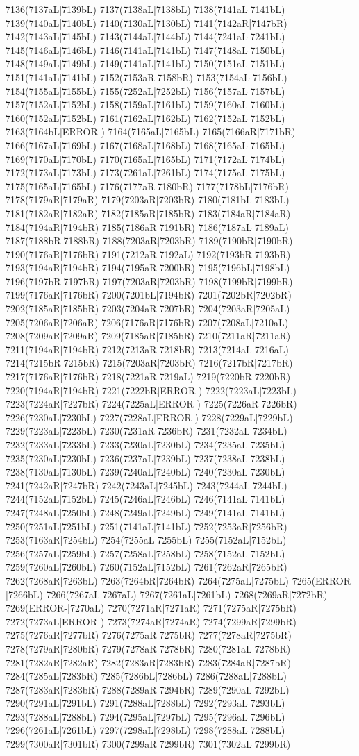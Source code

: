 7136(7137aL|7139bL) 7137(7138aL|7138bL) 7138(7141aL|7141bL) 7139(7140aL|7140bL) 7140(7130aL|7130bL) 7141(7142aR|7147bR) 7142(7143aL|7145bL) 7143(7144aL|7144bL) 7144(7241aL|7241bL) 7145(7146aL|7146bL) 7146(7141aL|7141bL) 7147(7148aL|7150bL) 7148(7149aL|7149bL) 7149(7141aL|7141bL) 7150(7151aL|7151bL) 7151(7141aL|7141bL) 7152(7153aR|7158bR) 7153(7154aL|7156bL) 7154(7155aL|7155bL) 7155(7252aL|7252bL) 7156(7157aL|7157bL) 7157(7152aL|7152bL) 7158(7159aL|7161bL) 7159(7160aL|7160bL) 7160(7152aL|7152bL) 7161(7162aL|7162bL) 7162(7152aL|7152bL) 7163(7164bL|ERROR-) 7164(7165aL|7165bL) 7165(7166aR|7171bR) 7166(7167aL|7169bL) 7167(7168aL|7168bL) 7168(7165aL|7165bL) 7169(7170aL|7170bL) 7170(7165aL|7165bL) 7171(7172aL|7174bL) 7172(7173aL|7173bL) 7173(7261aL|7261bL) 7174(7175aL|7175bL) 7175(7165aL|7165bL) 7176(7177aR|7180bR) 7177(7178bL|7176bR) 7178(7179aR|7179aR) 7179(7203aR|7203bR) 7180(7181bL|7183bL) 7181(7182aR|7182aR) 7182(7185aR|7185bR) 7183(7184aR|7184aR) 7184(7194aR|7194bR) 7185(7186aR|7191bR) 7186(7187aL|7189aL) 7187(7188bR|7188bR) 7188(7203aR|7203bR) 7189(7190bR|7190bR) 7190(7176aR|7176bR) 7191(7212aR|7192aL) 7192(7193bR|7193bR) 7193(7194aR|7194bR) 7194(7195aR|7200bR) 7195(7196bL|7198bL) 7196(7197bR|7197bR) 7197(7203aR|7203bR) 7198(7199bR|7199bR) 7199(7176aR|7176bR) 7200(7201bL|7194bR) 7201(7202bR|7202bR) 7202(7185aR|7185bR) 7203(7204aR|7207bR) 7204(7203aR|7205aL) 7205(7206aR|7206aR) 7206(7176aR|7176bR) 7207(7208aL|7210aL) 7208(7209aR|7209aR) 7209(7185aR|7185bR) 7210(7211aR|7211aR) 7211(7194aR|7194bR) 7212(7213aR|7218bR) 7213(7214aL|7216aL) 7214(7215bR|7215bR) 7215(7203aR|7203bR) 7216(7217bR|7217bR) 7217(7176aR|7176bR) 7218(7221aR|7219aL) 7219(7220bR|7220bR) 7220(7194aR|7194bR) 7221(7222bR|ERROR-) 7222(7223aL|7223bL) 7223(7224aR|7227bR) 7224(7225aL|ERROR-) 7225(7226aR|7226bR) 7226(7230aL|7230bL) 7227(7228aL|ERROR-) 7228(7229aL|7229bL) 7229(7223aL|7223bL) 7230(7231aR|7236bR) 7231(7232aL|7234bL) 7232(7233aL|7233bL) 7233(7230aL|7230bL) 7234(7235aL|7235bL) 7235(7230aL|7230bL) 7236(7237aL|7239bL) 7237(7238aL|7238bL) 7238(7130aL|7130bL) 7239(7240aL|7240bL) 7240(7230aL|7230bL) 7241(7242aR|7247bR) 7242(7243aL|7245bL) 7243(7244aL|7244bL) 7244(7152aL|7152bL) 7245(7246aL|7246bL) 7246(7141aL|7141bL) 7247(7248aL|7250bL) 7248(7249aL|7249bL) 7249(7141aL|7141bL) 7250(7251aL|7251bL) 7251(7141aL|7141bL) 7252(7253aR|7256bR) 7253(7163aR|7254bL) 7254(7255aL|7255bL) 7255(7152aL|7152bL) 7256(7257aL|7259bL) 7257(7258aL|7258bL) 7258(7152aL|7152bL) 7259(7260aL|7260bL) 7260(7152aL|7152bL) 7261(7262aR|7265bR) 7262(7268aR|7263bL) 7263(7264bR|7264bR) 7264(7275aL|7275bL) 7265(ERROR-|7266bL) 7266(7267aL|7267aL) 7267(7261aL|7261bL) 7268(7269aR|7272bR) 7269(ERROR-|7270aL) 7270(7271aR|7271aR) 7271(7275aR|7275bR) 7272(7273aL|ERROR-) 7273(7274aR|7274aR) 7274(7299aR|7299bR) 7275(7276aR|7277bR) 7276(7275aR|7275bR) 7277(7278aR|7275bR) 7278(7279aR|7280bR) 7279(7278aR|7278bR) 7280(7281aL|7278bR) 7281(7282aR|7282aR) 7282(7283aR|7283bR) 7283(7284aR|7287bR) 7284(7285aL|7283bR) 7285(7286bL|7286bL) 7286(7288aL|7288bL) 7287(7283aR|7283bR) 7288(7289aR|7294bR) 7289(7290aL|7292bL) 7290(7291aL|7291bL) 7291(7288aL|7288bL) 7292(7293aL|7293bL) 7293(7288aL|7288bL) 7294(7295aL|7297bL) 7295(7296aL|7296bL) 7296(7261aL|7261bL) 7297(7298aL|7298bL) 7298(7288aL|7288bL) 7299(7300aR|7301bR) 7300(7299aR|7299bR) 7301(7302aL|7299bR) 